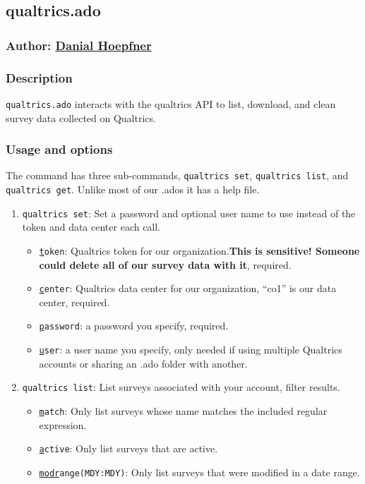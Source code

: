 {\subsection{qualtrics.ado}
\subsubsection{Author: \href{mailto:dhoepfner@gibsonconsult.com}{Danial Hoepfner}}
\subsubsection{Description}
\texttt{qualtrics.ado} interacts with the qualtrics API to list, download, and clean survey data collected on Qualtrics.
\subsubsection{Usage and options}
The command has three sub-commands, \texttt{qualtrics set}, \texttt{qualtrics list}, and \texttt{qualtrics get}. Unlike most of our .ados it has a help file.
\begin{enumerate}
\item \texttt{qualtrics set}: Set a password and optional user name to use instead of the token and data center each call.
\begin{itemize}
\item \texttt{\underline{t}oken}: Qualtrics token for our organization.\textbf{This is sensitive! Someone could delete all of our survey data with it}, required.
\item \texttt{\underline{c}enter}: Qualtrics data center for our organization, ``co1'' is our data center, required.
\item \texttt{\underline{p}assword}: a password you specify, required.
\item \texttt{\underline{u}ser}: a user name you specify, only needed if using multiple Qualtrics accounts or sharing an .ado folder with another.
\end{itemize}
\item \texttt{qualtrics list}: List surveys associated with your account, filter results.
\begin{itemize}
\item \texttt{\underline{m}atch}: Only list surveys whose name matches the included regular expression.
\item \texttt{\underline{a}ctive}: Only list surveys that are active.
\item \texttt{\underline{modr}ange(MDY:MDY)}: Only list surveys that were modified in a date range.

\end{itemize}
\end{enumerate}}
